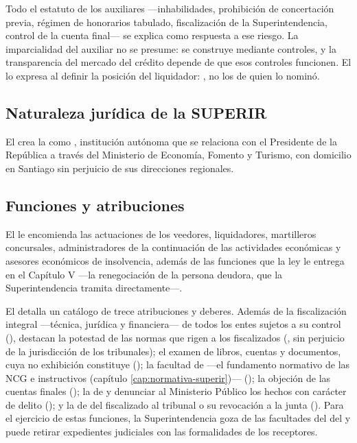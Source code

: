 Todo el estatuto de los auxiliares ---inhabilidades, prohibición de concertación previa,
régimen de honorarios tabulado, fiscalización de la Superintendencia, control de la cuenta
final--- se explica como respuesta a ese riesgo. La imparcialidad del auxiliar no se presume:
se construye mediante controles, y la transparencia del mercado del crédito depende de que
esos controles funcionen. El  lo expresa al definir la posición del liquidador:
, no los de quien lo nominó.

\bloqueNormativo

\subsection{Naturaleza jurídica de la SUPERIR}

El  \parencite{ley-20720} crea la \Superir{} como , institución autónoma que se
relaciona con el Presidente de la República a través del Ministerio de Economía, Fomento y
Turismo, con domicilio en Santiago sin perjuicio de sus direcciones regionales.

\subsection{Funciones y atribuciones}

El  le encomienda  las actuaciones de los
veedores, liquidadores, martilleros concursales, administradores de la continuación de las
actividades económicas y asesores económicos de insolvencia, además de las funciones que la
ley le entrega en el Capítulo V ---la renegociación de la persona deudora, que la
Superintendencia tramita directamente---.

El  detalla un catálogo de trece atribuciones y deberes. Además de la fiscalización
integral ---técnica, jurídica y financiera--- de todos los entes sujetos a su control (),
destacan la potestad de  las normas que rigen a los
fiscalizados (, sin perjuicio de la jurisdicción de los tribunales); el examen de libros,
cuentas y documentos, cuya no exhibición constituye  (); la facultad
de  ---el fundamento normativo de las
NCG e instructivos (capítulo \ref{cap:normativa-superir})--- (); la objeción de las cuentas
finales (); la de  y denunciar al
Ministerio Público los hechos con carácter de delito (); y la de  del fiscalizado al tribunal o su revocación a la junta (). Para el ejercicio de
estas funciones, la Superintendencia goza de las facultades del  del \cpc{} y puede
retirar expedientes judiciales con las formalidades de los receptores.

